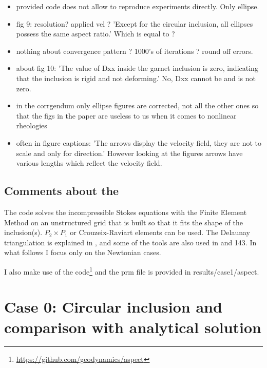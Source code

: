 \begin{itemize}
\item provided code does not allow to reproduce experiments directly. Only ellipse. 

\item fig 9: resolution? applied vel ? 'Except for the circular inclusion, all ellipses possess the same aspect ratio.' Which is equal to ?

\item nothing about convergence pattern ? 1000's of iterations ? round off errors.

\item about fig 10: 'The value of Dxx inside the garnet inclusion is zero, indicating that the inclusion is rigid and not deforming.' 
No, Dxx cannot be and is not zero. 

\item in the corrgendum only ellipse figures are corrected, not all the other ones so that the figs in the paper are useless 
to us when it comes to nonlinear rheologies

\item often in figure captions: 'The arrows display the velocity field, they are not to scale and only for direction.'
However looking at the figures arrows have various lengths which reflect the velocity field.

\end{itemize}


\subsection*{Comments about the \stone}

The code solves the incompressible Stokes equations with the Finite Element Method
on an unstructured grid that is built so that it fits the shape of the inclusion(s).
$P_2\times P_1$ or Crouzeix-Raviart elements can be used.
The Delaunay triangulation is explained in , and 
some of the tools are also used in  and 143.
In what follows I focus only on the Newtonian cases.

I also make use of the \aspect code\footnote{\url{https://github.com/geodynamics/aspect}}
and the prm file is provided in results/case1/aspect. 

\newpage
\section*{Case 0: Circular inclusion and comparison with analytical solution}

